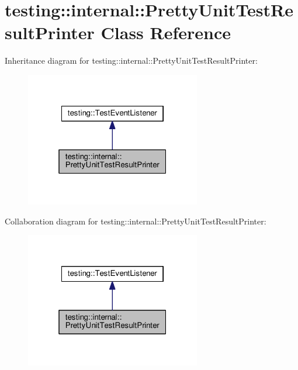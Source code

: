 \hypertarget{classtesting_1_1internal_1_1PrettyUnitTestResultPrinter}{}\section{testing\+:\+:internal\+:\+:Pretty\+Unit\+Test\+Result\+Printer Class Reference}
\label{classtesting_1_1internal_1_1PrettyUnitTestResultPrinter}


Inheritance diagram for testing\+:\+:internal\+:\+:Pretty\+Unit\+Test\+Result\+Printer\+:\nopagebreak
\begin{figure}[H]
\begin{center}
\leavevmode
\includegraphics[width=217pt]{classtesting_1_1internal_1_1PrettyUnitTestResultPrinter__inherit__graph}
\end{center}
\end{figure}


Collaboration diagram for testing\+:\+:internal\+:\+:Pretty\+Unit\+Test\+Result\+Printer\+:\nopagebreak
\begin{figure}[H]
\begin{center}
\leavevmode
\includegraphics[width=217pt]{classtesting_1_1internal_1_1PrettyUnitTestResultPrinter__coll__graph}
\end{center}
\end{figure}
